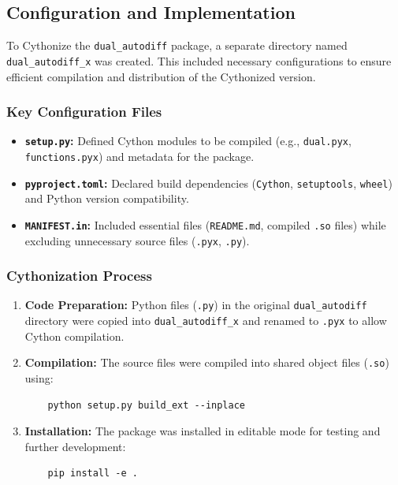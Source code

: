 \documentclass[a4paper,12pt]{article}
\begin{document}
\subsection{Configuration and Implementation}
To Cythonize the \texttt{dual\_autodiff} package, a separate directory named \texttt{dual\_autodiff\_x} was created. This included necessary configurations to ensure efficient compilation and distribution of the Cythonized version.

\subsubsection{Key Configuration Files}
\begin{itemize}
    \item \textbf{\texttt{setup.py}:} Defined Cython modules to be compiled (e.g., \texttt{dual.pyx}, \texttt{functions.pyx}) and metadata for the package.
    \item \textbf{\texttt{pyproject.toml}:} Declared build dependencies (\texttt{Cython}, \texttt{setuptools}, \texttt{wheel}) and Python version compatibility.
    \item \textbf{\texttt{MANIFEST.in}:} Included essential files (\texttt{README.md}, compiled \texttt{.so} files) while excluding unnecessary source files (\texttt{.pyx}, \texttt{.py}).
\end{itemize}

\subsubsection{Cythonization Process}
\begin{enumerate}
    \item \textbf{Code Preparation:} 
    Python files (\texttt{.py}) in the original \texttt{dual\_autodiff} directory were copied into \texttt{dual\_autodiff\_x} and renamed to \texttt{.pyx} to allow Cython compilation.
    
    \item \textbf{Compilation:} 
    The source files were compiled into shared object files (\texttt{.so}) using:
    \begin{verbatim}
    python setup.py build_ext --inplace
    \end{verbatim}
    
    \item \textbf{Installation:} 
    The package was installed in editable mode for testing and further development:
    \begin{verbatim}
    pip install -e .
    \end{verbatim}
\end{enumerate}
\end{document}
